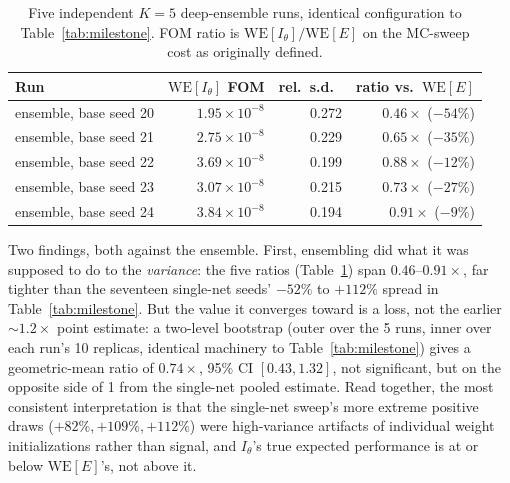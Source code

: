 \documentclass[a4paper,fleqn]{cas-sc}
\begin{document}
\begin{table}[H]
	\centering\small
	\caption{Five independent $K{=}5$ deep-ensemble runs, identical configuration to
		Table~\ref{tab:milestone}. FOM ratio is $\mathrm{WE}[I_\theta]/\mathrm{WE}[E]$ on the
		MC-sweep cost as originally defined.}
	\label{tab:ensemble}
	\begin{tabular}{lrrr}
		\toprule
		Run & $\mathrm{WE}[I_\theta]$ FOM & rel.\ s.d.\ & ratio vs.\ $\mathrm{WE}[E]$ \\
		\midrule
		ensemble, base seed 20 & $1.95\times10^{-8}$ & 0.272 & $0.46\times$ ($-54\%$) \\
		ensemble, base seed 21 & $2.75\times10^{-8}$ & 0.229 & $0.65\times$ ($-35\%$) \\
		ensemble, base seed 22 & $3.69\times10^{-8}$ & 0.199 & $0.88\times$ ($-12\%$) \\
		ensemble, base seed 23 & $3.07\times10^{-8}$ & 0.215 & $0.73\times$ ($-27\%$) \\
		ensemble, base seed 24 & $3.84\times10^{-8}$ & 0.194 & $0.91\times$ ($-9\%$) \\
		\bottomrule
	\end{tabular}
\end{table}

Two findings, both against the ensemble. First, ensembling did what it was
supposed to do to the \emph{variance}: the five ratios (Table~\ref{tab:ensemble}) span
$0.46$--$0.91\times$, far tighter than the seventeen single-net seeds' $-52\%$ to
$+112\%$ spread in Table~\ref{tab:milestone}. But the value it converges toward is a loss,
not the earlier
$\sim\!1.2\times$ point estimate: a two-level bootstrap (outer over the 5 runs, inner over
each run's 10 replicas, identical machinery to Table~\ref{tab:milestone}) gives a
geometric-mean ratio of $0.74\times$, 95\% CI $[0.43, 1.32]$, not significant, but on the
opposite side of 1 from the single-net pooled estimate. Read together, the most consistent
interpretation is that the single-net sweep's more extreme positive draws ($+82\%,
+109\%, +112\%$) were high-variance artifacts of individual weight initializations rather
than signal, and $I_\theta$'s true expected performance is at or below
$\mathrm{WE}[E]$'s, not above it.
\end{document}
